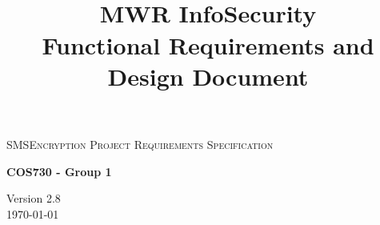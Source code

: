 \begin{titlepage}
\begin{center}

\textsc{\LARGE SMSEncryption Project Requirements Specification}

\textbf{COS730 - Group 1} \\

\title{
  \textbf{\\}
MWR InfoSecurity\\
Functional Requirements and Design Document\\
}

\vfill

{\large Version 2.8}
\\
{\large \today}

\end{center}
\end{titlepage}
